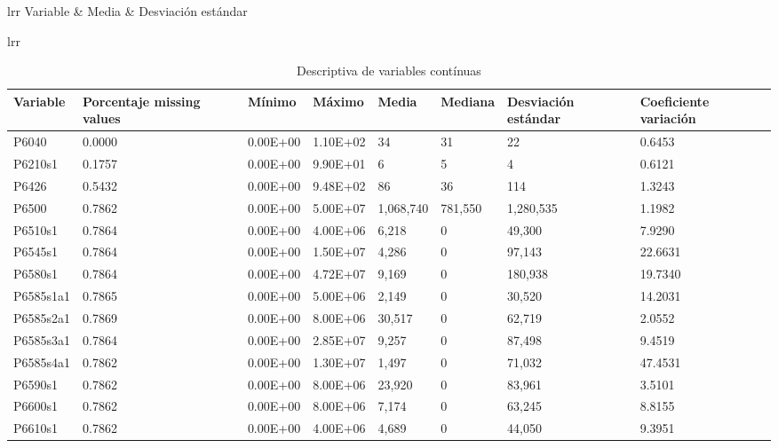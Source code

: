 \begin{table}[H]
\centering
\caption{Estadísticas descriptivas de variables continuas (personas)}
\label{tab:descriptiva_personas_continua}
\begin{tabular}{lrr}
\toprule
Variable & Media & Desviación estándar \\
\midrule
\begin{table}[!ht]
    \centering
    \caption{Descriptiva de variables contínuas}
    \label{tab:mi_tabla}
    \begin{tabular}{lrr}
    \toprule
    \begin{tabular}{|l|l|l|l|l|l|l|l|}
    \hline
        Variable & Porcentaje missing values & Mínimo & Máximo & Media & Mediana & Desviación estándar & Coeficiente variación \\ \hline
        P6040 & 0.0000 & 0.00E+00 & 1.10E+02 & 34 & 31 & 22 & 0.6453 \\ \hline
        P6210s1 & 0.1757 & 0.00E+00 & 9.90E+01 & 6 & 5 & 4 & 0.6121 \\ \hline
        P6426 & 0.5432 & 0.00E+00 & 9.48E+02 & 86 & 36 & 114 & 1.3243 \\ \hline
        P6500 & 0.7862 & 0.00E+00 & 5.00E+07 & 1,068,740 & 781,550 & 1,280,535 & 1.1982 \\ \hline
        P6510s1 & 0.7864 & 0.00E+00 & 4.00E+06 & 6,218 & 0 & 49,300 & 7.9290 \\ \hline
        P6545s1 & 0.7864 & 0.00E+00 & 1.50E+07 & 4,286 & 0 & 97,143 & 22.6631 \\ \hline
        P6580s1 & 0.7864 & 0.00E+00 & 4.72E+07 & 9,169 & 0 & 180,938 & 19.7340 \\ \hline
        P6585s1a1 & 0.7865 & 0.00E+00 & 5.00E+06 & 2,149 & 0 & 30,520 & 14.2031 \\ \hline
        P6585s2a1 & 0.7869 & 0.00E+00 & 8.00E+06 & 30,517 & 0 & 62,719 & 2.0552 \\ \hline
        P6585s3a1 & 0.7864 & 0.00E+00 & 2.85E+07 & 9,257 & 0 & 87,498 & 9.4519 \\ \hline
        P6585s4a1 & 0.7862 & 0.00E+00 & 1.30E+07 & 1,497 & 0 & 71,032 & 47.4531 \\ \hline
        P6590s1 & 0.7862 & 0.00E+00 & 8.00E+06 & 23,920 & 0 & 83,961 & 3.5101 \\ \hline
        P6600s1 & 0.7862 & 0.00E+00 & 8.00E+06 & 7,174 & 0 & 63,245 & 8.8155 \\ \hline
        P6610s1 & 0.7862 & 0.00E+00 & 4.00E+06 & 4,689 & 0 & 44,050 & 9.3951 \\ \hline

\end{tabular}
\end{tabular}
\end{table}
\end{tabular}
\end{table}
